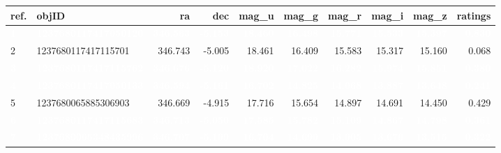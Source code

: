 \documentclass[]{elsarticle} %
\begin{document}
\begin{table}[H]
\centering
\begin{tabular}{l|l|r|r|r|r|r|r|r|r}
\hline
ref. & objID & ra & dec & mag\_u & mag\_g & mag\_r & mag\_i & mag\_z & ratings\\
\hline
\rowcolor[HTML]{D7261E}  \textcolor{white}{\textbf{1}} & \textcolor{white}{\textbf{1237680117417050120}} & \textcolor{white}{\textbf{346.563}} & \textcolor{white}{\textbf{-5.153}} & \textcolor{white}{\textbf{18.460}} & \textcolor{white}{\textbf{16.498}} & \textcolor{white}{\textbf{15.771}} & \textcolor{white}{\textbf{15.533}} & \textcolor{white}{\textbf{15.397}} & \textcolor{white}{\textbf{0.830}}\\
\hline
2 & 1237680117417115701 & 346.743 & -5.005 & 18.461 & 16.409 & 15.583 & 15.317 & 15.160 & 0.068\\
\hline
\rowcolor[HTML]{D7261E}  \textcolor{white}{\textbf{3}} & \textcolor{white}{\textbf{1237680117417115762}} & \textcolor{white}{\textbf{346.676}} & \textcolor{white}{\textbf{-5.120}} & \textcolor{white}{\textbf{18.920}} & \textcolor{white}{\textbf{17.022}} & \textcolor{white}{\textbf{16.282}} & \textcolor{white}{\textbf{15.974}} & \textcolor{white}{\textbf{15.851}} & \textcolor{white}{\textbf{0.380}}\\
\hline
\rowcolor[HTML]{D7261E}  \textcolor{white}{\textbf{4}} & \textcolor{white}{\textbf{1237680117417050133}} & \textcolor{white}{\textbf{346.594}} & \textcolor{white}{\textbf{-5.161}} & \textcolor{white}{\textbf{16.702}} & \textcolor{white}{\textbf{14.825}} & \textcolor{white}{\textbf{14.068}} & \textcolor{white}{\textbf{13.887}} & \textcolor{white}{\textbf{13.648}} & \textcolor{white}{\textbf{0.241}}\\
\hline
5 & 1237680065885306903 & 346.669 & -4.915 & 17.716 & 15.654 & 14.897 & 14.691 & 14.450 & 0.429\\
\hline
\rowcolor[HTML]{D7261E}  \textcolor{white}{\textbf{6}} & \textcolor{white}{\textbf{1237680117417115683}} & \textcolor{white}{\textbf{346.713}} & \textcolor{white}{\textbf{-5.050}} & \textcolor{white}{\textbf{17.585}} & \textcolor{white}{\textbf{15.782}} & \textcolor{white}{\textbf{15.109}} & \textcolor{white}{\textbf{14.867}} & \textcolor{white}{\textbf{14.798}} & \textcolor{white}{\textbf{0.361}}\\
\hline
\rowcolor[HTML]{D7261E}  \textcolor{white}{\textbf{7}} & \textcolor{white}{\textbf{1237680065348435996}} & \textcolor{white}{\textbf{346.707}} & \textcolor{white}{\textbf{-5.199}} & \textcolor{white}{\textbf{16.704}} & \textcolor{white}{\textbf{14.699}} & \textcolor{white}{\textbf{13.905}} & \textcolor{white}{\textbf{13.676}} & \textcolor{white}{\textbf{13.515}} & \textcolor{white}{\textbf{0.322}}\\

\end{tabular}
\end{table}
\end{document}
